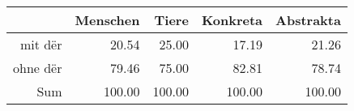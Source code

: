 \begin{tabular}{rrrrr}
  \hline
 & Menschen & Tiere & Konkreta & Abstrakta \\ 
  \hline
mit dër & 20.54 & 25.00 & 17.19 & 21.26 \\ 
  ohne dër & 79.46 & 75.00 & 82.81 & 78.74 \\ 
  Sum & 100.00 & 100.00 & 100.00 & 100.00 \\ 
   \hline
\end{tabular}

